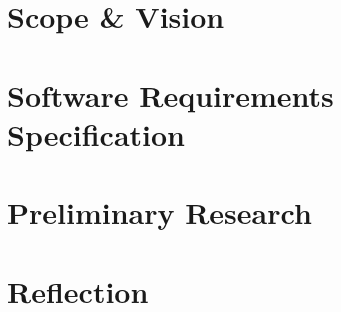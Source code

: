 \documentclass{article}
\begin{document}
\renewcommand\thepage{}


\begin{titlepage}

\end{titlepage}







\hypersetup{linkcolor=black}
\tableofcontents
\hypersetup{linkcolor=blue}


\section{Scope \& Vision}


\setcounter{page}{1}
\renewcommand\thepage{\arabic{page}}

\section{Software Requirements Specification}


\section{Preliminary Research} \label{sec:preliminary-research}


\section{Reflection}

\clearpage


\begin{appendices}

\end{appendices}


\printbibliography
\end{document}
